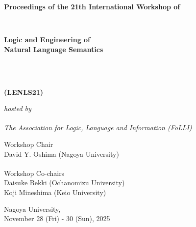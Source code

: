\documentclass[12pt]{jarticle}
\begin{document}
\pagestyle{empty}

\vspace*{1cm}

\begin{center}

\begin{Large}
{\bf Proceedings of the 21th International Workshop of}
\end{Large} 
\\
\begin{huge}
{\bf Logic and Engineering of \\
Natural Language Semantics} 
\end{huge}
\\\ \\
\begin{huge}
{\bf (LENLS21)}
\end{huge}

\vspace*{1cm}

\begin{Large}
{\em hosted by \\\ \\ The Association for Logic, Language and Information (FoLLI)}
\end{Large}

\begin{large}
\vspace*{1cm}
Workshop Chair\\ $\;$\\
David Y. Oshima (Nagoya University) \\
\ \\
Workshop Co-chairs\\ $\;$\\
Daisuke Bekki (Ochanomizu University) \\
Koji Mineshima (Keio University) \\

\end{large}

\vspace*{3cm}


\vspace*{1cm}

\begin{large}
Nagoya University, \\
November 28 (Fri) - 30 (Sun), 2025
\end{large}
\vfill

\end{center}
\end{document}
